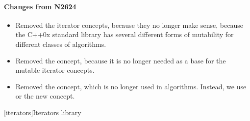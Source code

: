 \documentclass[american,twoside]{book}
\begin{document}
\begin{titlepage}
\paragraph*{Changes from N2624}
\begin{itemize}
\item Removed the  iterator concepts, because they no
  longer make sense, because the C++0x standard library has several
  different forms of mutability for different classes of algorithms.
\item Removed the  concept, because it is
  no longer needed as a base for the mutable iterator concepts.
\item Removed the  concept, which is no
  longer used in algorithms. Instead, we use  or the
  new  concept.
\end{itemize}

\end{titlepage}

\pagestyle{fancy}
\fancyhead[LE,RO]{\textbf{\rightmark}}
\fancyhead[RE]{\textbf{\leftmark\hspace{1em}\thepage}}
\fancyhead[LO]{\textbf{\thepage\hspace{1em}\leftmark}}


\renewcommand{\sectionmark}[1]{\markright{\thesection\hspace{1em}#1}}
\renewcommand{\chaptermark}[1]{\markboth{#1}{}}

\setcounter{chapter}{23}
[iterators]{Iterators library}
\end{document}
